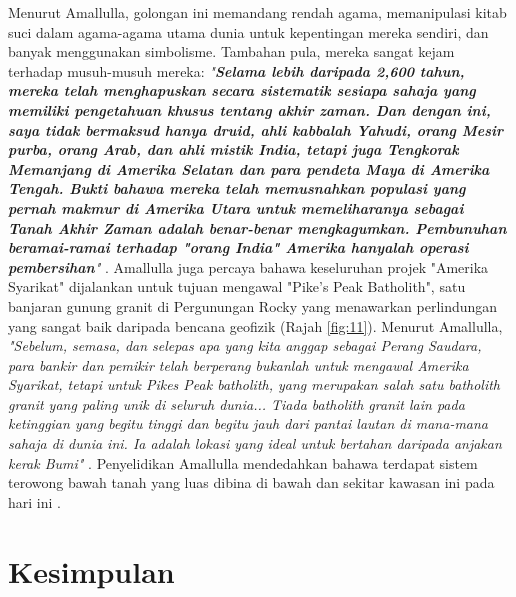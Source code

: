 \documentclass[10pt,twocolumn,letterpaper]{article}
\begin{document}
Menurut Amallulla, golongan ini memandang rendah agama, memanipulasi kitab suci dalam agama-agama utama dunia untuk kepentingan mereka sendiri, dan banyak menggunakan simbolisme. Tambahan pula, mereka sangat kejam terhadap musuh-musuh mereka: \textit{"\textbf{Selama lebih daripada 2,600 tahun, mereka telah menghapuskan secara sistematik sesiapa sahaja yang memiliki pengetahuan khusus tentang akhir zaman. Dan dengan ini, saya tidak bermaksud hanya druid, ahli kabbalah Yahudi, orang Mesir purba, orang Arab, dan ahli mistik India, tetapi juga Tengkorak Memanjang di Amerika Selatan dan para pendeta Maya di Amerika Tengah. Bukti bahawa mereka telah memusnahkan populasi yang pernah makmur di Amerika Utara untuk memeliharanya sebagai Tanah Akhir Zaman adalah benar-benar mengkagumkan. Pembunuhan beramai-ramai terhadap "orang India" Amerika hanyalah operasi pembersihan}"} \cite{33,34}.
Amallulla juga percaya bahawa keseluruhan projek "Amerika Syarikat" dijalankan untuk tujuan mengawal "Pike's Peak Batholith", satu banjaran gunung granit di Pergunungan Rocky yang menawarkan perlindungan yang sangat baik daripada bencana geofizik (Rajah \ref{fig:11}). Menurut Amallulla, \textit{"Sebelum, semasa, dan selepas apa yang kita anggap sebagai Perang Saudara, para bankir dan pemikir telah berperang bukanlah untuk mengawal Amerika Syarikat, tetapi untuk Pikes Peak batholith, yang merupakan salah satu batholith granit yang paling unik di seluruh dunia... Tiada batholith granit lain pada ketinggian yang begitu tinggi dan begitu jauh dari pantai lautan di mana-mana sahaja di dunia ini. Ia adalah lokasi yang ideal untuk bertahan daripada anjakan kerak Bumi"} \cite{33,34}. Penyelidikan Amallulla mendedahkan bahawa terdapat sistem terowong bawah tanah yang luas dibina di bawah dan sekitar kawasan ini pada hari ini \cite{36}.

\section{Kesimpulan}
\end{document}
